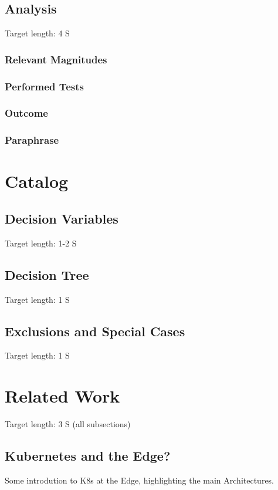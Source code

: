 \documentclass[MSC,Master,english]{twbook}%
\begin{document}
\section{Analysis}
Target length: 4 S
\subsection{Relevant Magnitudes}
\subsection{Performed Tests}
\subsection{Outcome}
\subsection{Paraphrase}



\chapter{Catalog}
\label{chap:catalog}

\section{Decision Variables}
\label{sec:variables}
Target length: 1-2 S

\section{Decision Tree}
\label{sec:tree}
Target length: 1 S

\section{Exclusions and Special Cases}
\label{sec:exclusions}
Target length: 1 S



\chapter{Related Work}
\label{chap:related}
Target length: 3 S (all subsections)
\section{Kubernetes and the Edge?}
Some introdution to K8s at the Edge, highlighting the main Architectures.
\end{document}
